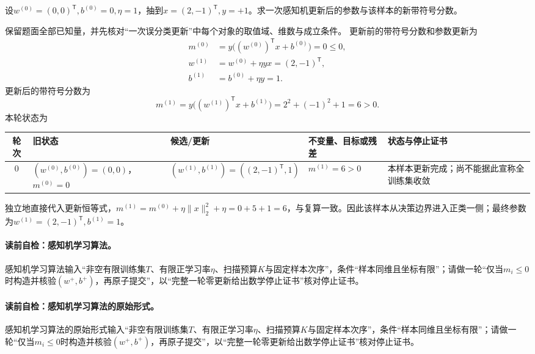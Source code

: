 \label{struct:V2-C01-CH18}
\begin{example}[一次误分类更新]\label{exm:V2-C01-update}
设$w^{(0)}=(0,0)^{\mathsf T},b^{(0)}=0,\eta=1$，抽到$x=(2,-1)^{\mathsf T},y=+1$。求一次感知机更新后的参数与该样本的新带符号分数。
\end{example}
\begin{solution}
\SolGiven 保留题面全部已知量，并先核对“一次误分类更新”中每个对象的取值域、维数与成立条件。
\SolDerive
更新前的带符号分数和参数更新为
\[
\begin{aligned}
m^{(0)}&=y\bigl((w^{(0)})^{\mathsf T}x+b^{(0)}\bigr)=0\leq0,\\
w^{(1)}&=w^{(0)}+\eta yx=(2,-1)^{\mathsf T},\\
b^{(1)}&=b^{(0)}+\eta y=1.
\end{aligned}
\]
更新后的带符号分数为
\[
m^{(1)}
=y\bigl((w^{(1)})^{\mathsf T}x+b^{(1)}\bigr)
=2^2+(-1)^2+1
=6>0.
\]
本轮状态为
\begin{center}
\begin{tabularx}{\linewidth}{@{}c X X X X@{}}
\toprule
轮次 & 旧状态 & 候选/更新 & 不变量、目标或残差 & 状态与停止证书\\
\midrule
$0$ & $(w^{(0)},b^{(0)})=(0,0)$，$m^{(0)}=0$ & $(w^{(1)},b^{(1)})=((2,-1)^{\mathsf T},1)$ & $m^{(1)}=6>0$ & 本样本更新完成；尚不能据此宣称全训练集收敛\\
\bottomrule
\end{tabularx}
\end{center}
独立地直接代入更新恒等式，$m^{(1)}=m^{(0)}+\eta\|x\|_2^2+\eta=0+5+1=6$，与复算一致。因此该样本从决策边界进入正类一侧；最终参数为$w^{(1)}=(2,-1)^{\mathsf T},b^{(1)}=1$。
\end{solution}


\paragraph{读前自检：感知机学习算法。}感知机学习算法输入“非空有限训练集$T$、有限正学习率$\eta$、扫描预算$K$与固定样本次序”，条件“样本同维且坐标有限”；请做一轮“仅当$m_i\le0$时构造并核验$(w^+,b^+)$，再原子提交”，以“完整一轮零更新给出数学停止证书”核对停止证书。\par
\paragraph{读前自检：感知机学习算法的原始形式。}感知机学习算法的原始形式输入“非空有限训练集$T$、有限正学习率$\eta$、扫描预算$K$与固定样本次序”，条件“样本同维且坐标有限”；请做一轮“仅当$m_i\le0$时构造并核验$(w^+,b^+)$，再原子提交”，以“完整一轮零更新给出数学停止证书”核对停止证书。\par
